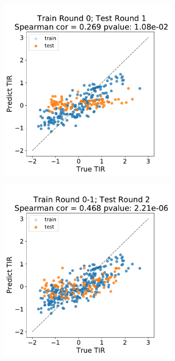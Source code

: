 \documentclass{scrartcl}[2013/05/29]%
\begin{document}
\begin{figure}[!ht]
    \centering
    \begin{subfigure}[b]{0.49\textwidth}
        \centering
        \caption{}
        \includegraphics[scale=0.4]{plots/Main_Paper/scatter_abc1_FF_0.pdf}
    \end{subfigure}
    \begin{subfigure}[b]{0.49\textwidth}
        \centering
        \caption{}
        \includegraphics[scale=0.4]{plots/Main_Paper/scatter_abc1_FF_1.pdf}

\end{subfigure}
\end{figure}
\end{document}

